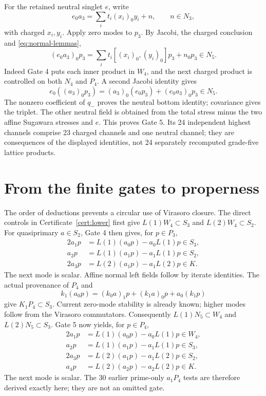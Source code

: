 \documentclass[11pt,a4paper]{article}
\theoremstyle{definition}
\begin{document}
For the retained neutral singlet \(e\), write
\[
 e_0a_3=\sum_i t_i(x_i)_0y_i+n,
 \qquad n\in N_3,
\]
with charged \(x_i,y_i\). Apply zero modes to \(p_3\). By Jacobi,
the charged conclusion and \eqref{eq:normal-lemmas},
\[
 (e_0a_3)_0p_3
 =\sum_i t_i[(x_i)_0,(y_i)_0]p_3+n_0p_3\in N_5.
\]
Indeed Gate 4 puts each inner product in \(W_4\), and the next charged
product is controlled on both \(N_4\) and \(P_4\). A second Jacobi
identity gives
\[
 e_0((a_3)_0p_3)=(a_3)_0(e_0p_3)+(e_0a_3)_0p_3\in N_5.
\]
The nonzero coefficient of \(q_-\) proves the neutral bottom identity;
covariance gives the triplet. The other neutral field is obtained from
the total stress minus the two affine Sugawara stresses and \(e\).
This proves Gate 5. Its 24 independent highest channels comprise
23 charged channels and one neutral channel; they are consequences
of the displayed identities, not 24 separately recomputed grade-five
lattice products.

\section{From the finite gates to properness}\label{sec:properness}
The order of deductions prevents a circular use of Virasoro closure.
The direct controls in Certificate~\ref{cert:lower} first give
\(L(1)W_4\subset S_3\) and \(L(2)W_4\subset S_2\).
For quasiprimary \(a\in S_2\), Gate 4 then gives, for \(p\in P_3\),
\begin{align*}
 2a_1p&=L(1)(a_0p)-a_0L(1)p\in S_3,\\
 a_2p&=L(1)(a_1p)-a_1L(1)p\in S_2,\\
 2a_3p&=L(2)(a_1p)-a_1L(2)p\in K.
\end{align*}
The next mode is scalar. Affine normal left fields follow by iterate
identities. The actual provenance of \(P_4\) and
\[
 k_1(a_0p)=(k_0a)_1p+(k_1a)_0p+a_0(k_1p)
\]
give \(K_1P_4\subset S_3\). Current zero-mode stability is already
known; higher modes follow from the Virasoro commutators.
Consequently \(L(1)N_5\subset W_4\) and \(L(2)N_5\subset S_3\).
Gate 5 now yields, for \(p\in P_4\),
\begin{align*}
 2a_1p&=L(1)(a_0p)-a_0L(1)p\in W_4,\\
 a_2p&=L(1)(a_1p)-a_1L(1)p\in S_3,\\
 2a_3p&=L(2)(a_1p)-a_1L(2)p\in S_2,\\
 a_4p&=L(2)(a_2p)-a_2L(2)p\in K.
\end{align*}
The next mode is scalar. The 30 earlier prime-only \(a_1P_4\)
tests are therefore derived exactly here; they are not an omitted gate.
\end{document}
